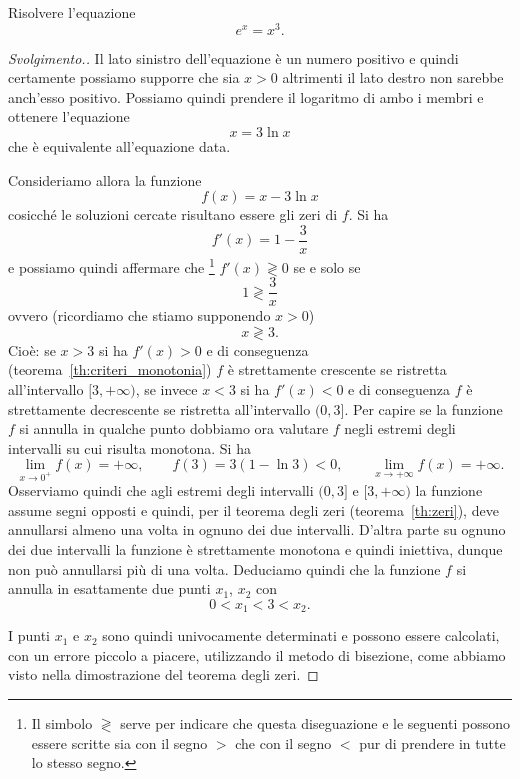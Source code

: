 \begin{exercise}
Risolvere l'equazione
\begin{equation} \label{eq:4734521}
  e^x = x^3.
\end{equation}
\end{exercise}
%
\begin{proof}[Svolgimento.]
Il lato sinistro dell'equazione è un numero positivo e quindi
certamente possiamo supporre che sia $x>0$ altrimenti il lato destro non sarebbe anch'esso positivo.
Possiamo quindi prendere il logaritmo di ambo i membri
e ottenere l'equazione
\[
  x = 3 \ln x
\]
che è equivalente all'equazione data.

Consideriamo allora la funzione
\[
 f(x) = x - 3 \ln x
\]
cosicché le soluzioni cercate risultano essere gli zeri di $f$.
Si ha
\[
  f'(x) = 1 - \frac{3}{x}
\]
e possiamo quindi affermare che%
\footnote{Il simbolo $\gtrless$ serve per indicare che questa
diseguazione e le seguenti possono essere scritte sia con il segno
$>$ che con il segno $<$ pur di prendere in tutte lo stesso segno.}
 $f'(x) \gtrless 0$
se e solo se
\[
  1 \gtrless \frac 3 x
\]
ovvero (ricordiamo che stiamo supponendo $x>0$)
\[
  x \gtrless 3.
\]
Cioè: se $x>3$ si ha $f'(x)>0$ e di conseguenza
(teorema~\ref{th:criteri_monotonia})
$f$ è strettamente crescente se ristretta all'intervallo
$[3,+\infty)$,
se invece $x<3$ si ha $f'(x)<0$ e di conseguenza
$f$ è strettamente decrescente se ristretta all'intervallo
$(0,3]$.
Per capire se la funzione $f$ si annulla in qualche punto
dobbiamo ora valutare $f$ negli estremi degli intervalli su cui risulta monotona. Si ha
\[
  \lim_{x\to 0^+} f(x) = +\infty, \qquad
  f(3) = 3 (1 - \ln 3) <0, \qquad
  \lim_{x\to +\infty} f(x) = +\infty.
\]
Osserviamo quindi che agli estremi degli intervalli
$(0,3]$ e $[3,+\infty)$ la funzione assume segni opposti e quindi, per il teorema degli zeri (teorema~\ref{th:zeri}), deve annullarsi almeno una volta in ognuno dei due intervalli. D'altra parte su ognuno dei due intervalli la funzione è strettamente monotona e quindi iniettiva, dunque non può annullarsi più di una volta. Deduciamo quindi che la funzione $f$ si annulla in esattamente due punti $x_1$, $x_2$ con
\[
  0 < x_1 < 3 < x_2.
\]

I punti $x_1$ e $x_2$ sono quindi univocamente determinati
e possono essere calcolati, con un errore piccolo a piacere,
utilizzando il metodo di bisezione, come abbiamo
visto nella dimostrazione del teorema degli zeri.
\end{proof}

